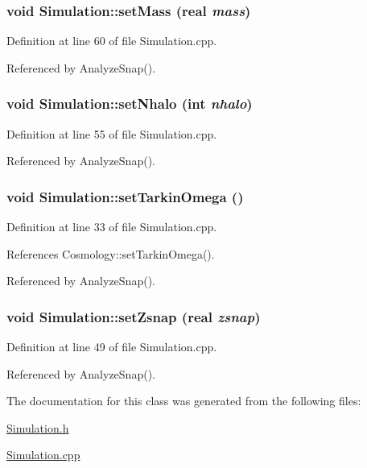 \subsubsection[{setMass}]{\setlength{\rightskip}{0pt plus 5cm}void Simulation::setMass ({\bf real} {\em mass})}\label{classSimulation_a315d0faa24c9893d4fef8f50ed0e714a}


Definition at line 60 of file Simulation.cpp.



Referenced by AnalyzeSnap().

\subsubsection[{setNhalo}]{\setlength{\rightskip}{0pt plus 5cm}void Simulation::setNhalo (int {\em nhalo})}\label{classSimulation_a3ba01b322f66c0c31e5e2868c6e9d87a}


Definition at line 55 of file Simulation.cpp.



Referenced by AnalyzeSnap().

\subsubsection[{setTarkinOmega}]{\setlength{\rightskip}{0pt plus 5cm}void Simulation::setTarkinOmega ()}\label{classSimulation_a20bb9b13e7882a76fac7009cc848ed9a}


Definition at line 33 of file Simulation.cpp.



References Cosmology::setTarkinOmega().



Referenced by AnalyzeSnap().

\subsubsection[{setZsnap}]{\setlength{\rightskip}{0pt plus 5cm}void Simulation::setZsnap ({\bf real} {\em zsnap})}\label{classSimulation_a6cd5d9b2efc9be5af7119ab78d0b033b}


Definition at line 49 of file Simulation.cpp.



Referenced by AnalyzeSnap().



The documentation for this class was generated from the following files:\begin{DoxyCompactItemize}
\item 
\hyperlink{Simulation_8h}{Simulation.h}\item 
\hyperlink{Simulation_8cpp}{Simulation.cpp}\end{DoxyCompactItemize}
